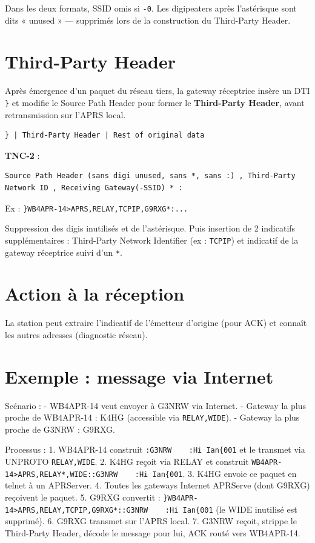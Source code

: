 Dans les deux formats, SSID omis si \texttt{-0}. Les digipeaters après
l'astérisque sont dits « unused » --- supprimés lors de la construction
du Third-Party Header.

\section{Third-Party Header}\label{third-party-header}

Après émergence d'un paquet du réseau tiers, la gateway réceptrice
insère un DTI \texttt{\}} et modifie le Source Path Header pour former
le \textbf{Third-Party Header}, avant retransmission sur l'APRS local.

\begin{verbatim}
} | Third-Party Header | Rest of original data
\end{verbatim}

\textbf{TNC-2} :

\begin{verbatim}
Source Path Header (sans digi unused, sans *, sans :) , Third-Party Network ID , Receiving Gateway(-SSID) * :
\end{verbatim}

Ex : \texttt{\}WB4APR-14\textgreater{}APRS,RELAY,TCPIP,G9RXG*:...}

Suppression des digis inutilisés et de l'astérisque. Puis insertion de 2
indicatifs supplémentaires : Third-Party Network Identifier (ex :
\texttt{TCPIP}) et indicatif de la gateway réceptrice suivi d'un
\texttt{*}.

\section{Action à la réception}\label{action-uxe0-la-ruxe9ception}

La station peut extraire l'indicatif de l'émetteur d'origine (pour ACK)
et connaît les autres adresses (diagnostic réseau).

\section{Exemple : message via
Internet}\label{exemple-message-via-internet}

Scénario : - WB4APR-14 veut envoyer à G3NRW via Internet. - Gateway la
plus proche de WB4APR-14 : K4HG (accessible via \texttt{RELAY,WIDE}). -
Gateway la plus proche de G3NRW : G9RXG.

Processus : 1. WB4APR-14 construit \texttt{:G3NRW\ \ \ \ :Hi\ Ian\{001}
et le transmet via UNPROTO \texttt{RELAY,WIDE}. 2. K4HG reçoit via RELAY
et construit
\texttt{WB4APR-14\textgreater{}APRS,RELAY*,WIDE::G3NRW\ \ \ \ :Hi\ Ian\{001}.
3. K4HG envoie ce paquet en telnet à un APRServer. 4. Toutes les
gateways Internet APRServe (dont G9RXG) reçoivent le paquet. 5. G9RXG
convertit :
\texttt{\}WB4APR-14\textgreater{}APRS,RELAY,TCPIP,G9RXG*::G3NRW\ \ \ \ :Hi\ Ian\{001}
(le WIDE inutilisé est supprimé). 6. G9RXG transmet sur l'APRS local. 7.
G3NRW reçoit, strippe le Third-Party Header, décode le message pour lui,
ACK routé vers WB4APR-14.

